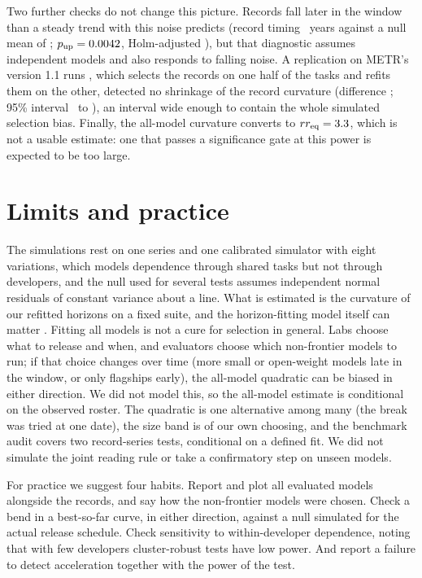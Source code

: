 \documentclass[aps,pre,twocolumn,superscriptaddress,nofootinbib,10pt]{revtex4-2}
\newcommand{\rreq}{rr_{\rm eq}}
\begin{document}
Two further checks do not change this picture. Records fall later in the window than a steady trend with this noise predicts (record timing \realRrateObs\ years against a null mean of \realRrateNull; $p_{\rm up}=0.0042$, Holm-adjusted \holmRrate), but that diagnostic assumes independent models and also responds to falling noise. A replication on METR's version 1.1 runs \cite{metr2026th11}, which selects the records on one half of the tasks and refits them on the other, detected no shrinkage of the record curvature (difference \stDone; 95\% interval \stDoneLo\ to \stDoneHi), an interval wide enough to contain the whole simulated selection bias. Finally, the all-model curvature converts to $\rreq=\rrEqAll$, which is not a usable estimate: one that passes a significance gate at this power is expected to be too large.

\section{Limits and practice}\label{sec:disc}
The simulations rest on one series and one calibrated simulator with eight variations, which models dependence through shared tasks but not through developers, and the null used for several tests assumes independent normal residuals of constant variance about a line. What is estimated is the curvature of our refitted horizons on a fixed suite, and the horizon-fitting model itself can matter \cite{nguyen2026}. Fitting all models is not a cure for selection in general. Labs choose what to release and when, and evaluators choose which non-frontier models to run; if that choice changes over time (more small or open-weight models late in the window, or only flagships early), the all-model quadratic can be biased in either direction. We did not model this, so the all-model estimate is conditional on the observed roster. The quadratic is one alternative among many (the break was tried at one date), the size band is of our own choosing, and the benchmark audit covers two record-series tests, conditional on a defined fit. We did not simulate the joint reading rule or take a confirmatory step on unseen models.

For practice we suggest four habits. Report and plot all evaluated models alongside the records, and say how the non-frontier models were chosen. Check a bend in a best-so-far curve, in either direction, against a null simulated for the actual release schedule. Check sensitivity to within-developer dependence, noting that with few developers cluster-robust tests have low power. And report a failure to detect acceleration together with the power of the test.
\end{document}
